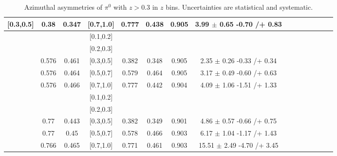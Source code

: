 \begin{table}[H]
\begin{tabular}{|c| c| c| c| c| c| c| c| c| c|c| c| c| c| c|}
[0.3,0.5]	&	0.38	&	0.347	&	[0.7,1.0]	&	0.777	&	0.438	&	0.905	&	3.99	$\pm$	0.65	-0.70	/+	0.83	\\ \hline
[0.5,0.7]	&		&		&	[0.1,0.2]	&		&		&		&							\\ \hline
[0.5,0.7]	&		&		&	[0.2,0.3]	&		&		&		&							\\ \hline
[0.5,0.7]	&	0.576	&	0.461	&	[0.3,0.5]	&	0.382	&	0.348	&	0.905	&	2.35	$\pm$	0.26	-0.33	/+	0.34	\\ \hline
[0.5,0.7]	&	0.576	&	0.464	&	[0.5,0.7]	&	0.579	&	0.464	&	0.905	&	3.17	$\pm$	0.49	-0.60	/+	0.63	\\ \hline
[0.5,0.7]	&	0.576	&	0.466	&	[0.7,1.0]	&	0.777	&	0.442	&	0.904	&	4.09	$\pm$	1.06	-1.51	/+	1.33	\\ \hline
[0.7,1.0]	&		&		&	[0.1,0.2]	&		&		&		&							\\ \hline
[0.7,1.0]	&		&		&	[0.2,0.3]	&		&		&		&							\\ \hline
[0.7,1.0]	&	0.77	&	0.443	&	[0.3,0.5]	&	0.382	&	0.349	&	0.901	&	4.86	$\pm$	0.57	-0.66	/+	0.75	\\ \hline
[0.7,1.0]	&	0.77	&	0.45	&	[0.5,0.7]	&	0.578	&	0.466	&	0.903	&	6.17	$\pm$	1.04	-1.17	/+	1.43	\\ \hline
[0.7,1.0]	&	0.766	&	0.465	&	[0.7,1.0]	&	0.771	&	0.461	&	0.903	&	15.51	$\pm$	2.49	-4.70	/+	3.45	\\ \hline
\end{tabular}
\caption{Azimuthal asymmetries of $\pi^0$ with $z>0.3$ in $z$ bins. Uncertainties are statistical and systematic.}
\label{tab:finaletazbin2}
\end{table}

